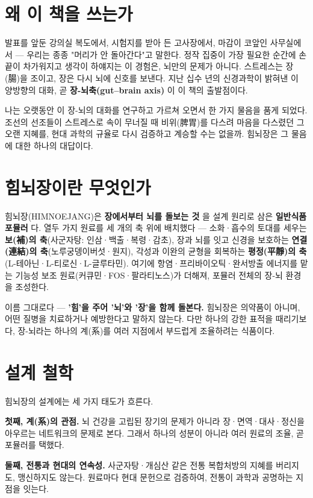 \documentclass[11pt,oneside]{book}
\begin{document}
\section{왜 이 책을 쓰는가}
발표를 앞둔 강의실 복도에서, 시험지를 받아 든 고사장에서, 마감이 코앞인 사무실에서 — 우리는 종종 "머리가 안 돌아간다"고 말한다. 정작 집중이 가장 필요한 순간에 손끝이 차가워지고 생각이 하얘지는 이 경험은, 뇌만의 문제가 아니다. 스트레스는 장(腸)을 조이고, 장은 다시 뇌에 신호를 보낸다. 지난 십수 년의 신경과학이 밝혀낸 이 양방향의 대화, 곧 \textbf{장-뇌축(gut–brain axis)} 이 이 책의 출발점이다.

나는 오랫동안 이 장-뇌의 대화를 연구하고 가르쳐 오면서 한 가지 물음을 품게 되었다. 조선의 선조들이 스트레스로 속이 무너질 때 비위(脾胃)를 다스려 마음을 다스렸던 그 오랜 지혜를, 현대 과학의 규율로 다시 검증하고 계승할 수는 없을까. 힘뇌장은 그 물음에 대한 하나의 대답이다.

\section{힘뇌장이란 무엇인가}
힘뇌장(HIMNOEJANG)은 \textbf{장에서부터 뇌를 돌보는 것} 을 설계 원리로 삼은 \textbf{일반식품 포뮬러} 다. 열두 가지 원료를 세 개의 축 위에 배치했다 — 소화·흡수의 토대를 세우는 \textbf{보(補)의 축}(사군자탕: 인삼·백출·복령·감초), 장과 뇌를 잇고 신경을 보호하는 \textbf{연결(連結)의 축}(노루궁뎅이버섯·원지), 각성과 이완의 균형을 회복하는 \textbf{평정(平靜)의 축}(L-테아닌·L-티로신·L-글루타민). 여기에 항염·프리바이오틱·완서방출 에너지를 맡는 기능성 보조 원료(커큐민·FOS·팔라티노스)가 더해져, 포뮬러 전체의 장-뇌 환경을 조성한다.

이름 그대로다 — \textbf{'힘'을 주어 '뇌'와 '장'을 함께 돌본다.} 힘뇌장은 의약품이 아니며, 어떤 질병을 치료하거나 예방한다고 말하지 않는다. 다만 하나의 강한 표적을 때리기보다, 장-뇌라는 하나의 계(系)를 여러 지점에서 부드럽게 조율하려는 식품이다.

\section{설계 철학}
힘뇌장의 설계에는 세 가지 태도가 흐른다.

\textbf{첫째, 계(系)의 관점.} 뇌 건강을 고립된 장기의 문제가 아니라 장·면역·대사·정신을 아우르는 네트워크의 문제로 본다. 그래서 하나의 성분이 아니라 여러 원료의 조율, 곧 포뮬러를 택했다.

\textbf{둘째, 전통과 현대의 연속성.} 사군자탕·개심산 같은 전통 복합처방의 지혜를 버리지도, 맹신하지도 않는다. 원료마다 현대 문헌으로 검증하여, 전통이 과학과 공명하는 지점을 잇는다.
\end{document}
